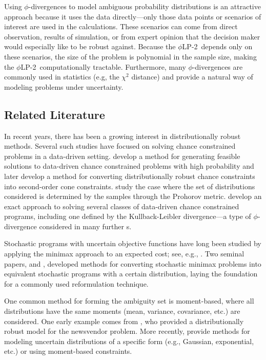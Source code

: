 \documentclass[opre,nonblindrev]{informs3} %
\newcommand{\plp}{$\phi$LP-2}
\begin{document}
Using $\phi$-divergences to model ambiguous probability distributions is an attractive approach because it uses the data directly---only those data points or scenarios of interest are used in the calculations.
These scenarios can come from direct observation, results of simulation, or from expert opinion that the decision maker would especially like to be robust against.
Because the \plp\ depends only on these scenarios, the size of the problem is polynomial in the sample size, making the \plp\ computationally tractable.
Furthermore, many $\phi$-divergences are commonly used in statistics (e.g, the $\chi^2$ distance) and provide a natural way of modeling problems under uncertainty. 

\subsection{Related Literature}

In recent years, there has been a growing interest in distributionally robust methods.
Several such studies have focused on solving chance constrained problems in a data-driven setting.
\citet{calafiore2005uncertain} develop a method for generating feasible solutions to data-driven chance constrained problems with high probability and later \citet{calafiore2006distributionally} develop a method for converting distributionally robust chance constraints into second-order cone constraints.
\citet{erdogan2006ambiguous} study the case where the set of distributions considered is determined by the samples through the Prohorov metric.
\citet{jiang2012data} develop an exact approach to solving several classes of data-driven chance constrained programs, including one defined by the Kullback-Leibler divergence---a type of $\phi$-divergence considered in many further s.

Stochastic programs with uncertain objective functions have long been studied by applying the minimax approach to an expected cost; see, e.g., \citep{zackova1966minimax,dupacova_87}.
Two seminal papers, \citet{shapiro2002minimax} and \citet{shapiro2004class}, developed methods for converting stochastic minimax problems into equivalent stochastic programs with a certain distribution, laying the foundation for a commonly used reformulation technique.

One common method for forming the ambiguity set is moment-based, where all distributions have the same moments (mean, variance, covariance, etc.) are considered.
One early example comes from \citet{scarf1958min}, who provided a distributionally robust model for the newsvendor problem.
More recently, \citet{delage2010distributionally} provide methods for modeling uncertain distributions of a specific form (e.g., Gaussian, exponential, etc.) or using moment-based constraints.
\end{document}
